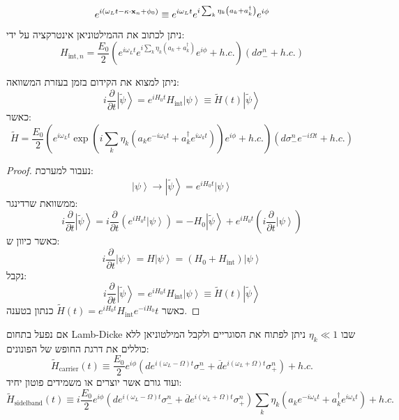 \documentclass{tstextbook}
\begin{document}
\begin{corollary}
$$e^{i\left(\omega_{L}t-\kappa\cdot{\bf x}_{n}+\phi_{0}\right)}\equiv e^{i\omega_{L}t}e^{i\sum_{k}\eta_{k}\left(a_{k}+a_{k}^{\dagger}\right)}e^{i\phi}$$

\end{corollary}
\begin{corollary}
ניתן לכתוב את ההמילטוניאן אינטרקציה על ידי:
$$H_{\mathrm{int},n}=\frac{E_{0}}{2}\left(e^{i\omega_{L}t}e^{i\sum_{k}\eta_{k}\left(a_{k}+a_{k}^{\dagger}\right)}e^{i\phi}+h.c.\right)\left(d\sigma_{-}^{n}+h.c.\right)$$

\end{corollary}
\begin{proposition}
ניתן למצוא את הקידום בזמן בעזרת המשוואה:
$$i\frac{\partial}{\partial t}\left|\widetilde{\psi}\right\rangle=e^{i H_{0}t}H_{\mathrm{int}}\left|\psi\right\rangle\equiv\widetilde{H}\left(t\right)\left|\widetilde{\psi}\right\rangle$$
כאשר:
$$\widetilde{H}=\frac{E_{0}}{2}\left(e^{i\omega_{L}t}\exp\left(i\sum_{k}\eta_{k}\left(a_{k}e^{-i\omega_{k}t}+a_{k}^{\dagger}e^{i\omega_{k}t}\right)\right)e^{i\phi}+h.c.\right)\left(d\sigma_{-}^{n}e^{-i\Omega t}+h.c.\right)$$

\end{proposition}
\begin{proof}
נעבור למערכת:
$$\left|\psi\right\rangle\longrightarrow\left|\widetilde{\psi}\right\rangle=e^{i H_{0}t}\left|\psi\right\rangle$$
ממשוואת שרדינגר:
$$i\frac{\partial}{\partial t}\left|\widetilde{\psi}\right\rangle=i\frac{\partial}{\partial t}\left(e^{i H_{0}t}\left|\psi\right\rangle\right)=-H_{0}\left|\widetilde{\psi}\right\rangle+e^{i H_{0}t}\left(i\frac{\partial}{\partial t}\left|\psi\right\rangle\right)$$
כאשר כיוון ש:
$$i\frac{\partial}{\partial t}\left|\psi\right\rangle=H\left|\psi\right\rangle=\left(H_{0}+H_{\mathrm{int}}\right)\left|\psi\right\rangle$$
נקבל:
$$i\frac{\partial}{\partial t}\left|\widetilde{\psi}\right\rangle=e^{i H_{0}t}H_{\mathrm{{int}}}\left|\psi\right\rangle\equiv\widetilde{H}\left(t\right)\left|\widetilde{\psi}\right\rangle$$
כאשר \(\tilde{H}(t)=e^{ iH_{0}t }H_{\text{int}}e^{ -iH_{0} }t\) כנתון בטענה.

\end{proof}
\begin{proposition}
אם נפעל בתחום Lamb-Dicke שבו \(\eta_{k}\ll 1\) ניתן לפתוח את הסוגריים ולקבל המילטוניאן ללא כוללים את דרגת החופש של הפונונים:
$$\widetilde{H}_{\mathrm{carrier}}\left(t\right)\equiv\frac{E_{0}}{2}e^{i\phi}\left(d e^{i\left(\omega_{L}-\Omega\right)t}\sigma_{-}^{n}+\overline{{{d}}}e^{i\left(\omega_{L}+\Omega\right)t}\sigma_{+}^{n}\right)+h.c.$$
ועוד גורם אשר יוצרים או משמידים פוטון יחיד:
$$\widetilde{H}_{\mathrm{sidelband}}\left(t\right)\equiv i\frac{E_{0}}{2}e^{i\phi}\left(d e^{i\left(\omega_{L}-\Omega\right)t}\sigma_{-}^{n}+\overline{{{d}}}e^{i\left(\omega_{L}+\Omega\right)t}\sigma_{+}^{n}\right)\sum_{k}\eta_{k}\left(a_{k}e^{-i\omega_{k}t}+a_{k}^{\dagger}e^{i\omega_{k}t}\right)+h.c.$$

\end{proposition}
\end{document}
